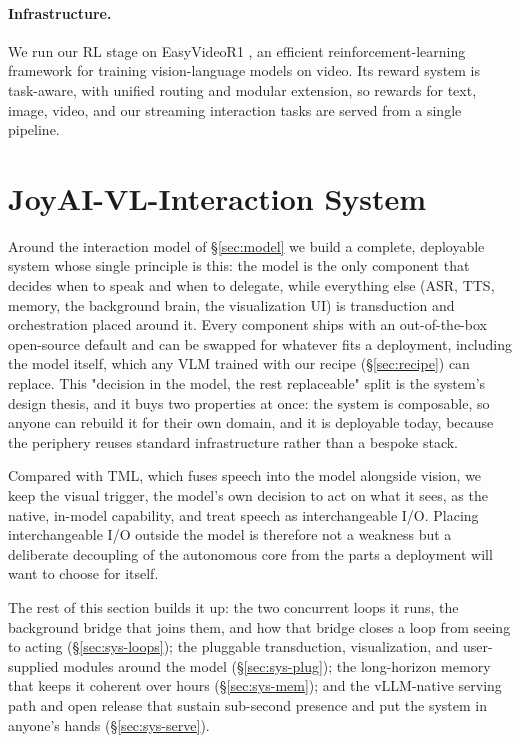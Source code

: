 \paragraph{\textbf{Infrastructure.}}
We run our RL stage on EasyVideoR1 \cite{qin2026easyvideor1easierrlvideo}, an efficient reinforcement-learning framework for training vision-language models on video. Its reward system is task-aware, with unified routing and modular extension, so rewards for text, image, video, and our streaming interaction tasks are served from a single pipeline. 





\section{JoyAI-VL-Interaction System}\label{sec:system}
Around the interaction model of §\ref{sec:model} we build a complete, deployable system whose single principle is this: the model is the only component that decides when to speak and when to delegate, while everything else (ASR, TTS, memory, the background brain, the visualization UI) is transduction and orchestration placed around it. Every component ships with an out-of-the-box open-source default and can be swapped for whatever fits a deployment, including the model itself, which any VLM trained with our recipe (§\ref{sec:recipe}) can replace. This "decision in the model, the rest replaceable" split is the system's design thesis, and it buys two properties at once: the system is composable, so anyone can rebuild it for their own domain, and it is deployable today, because the periphery reuses standard infrastructure rather than a bespoke stack.

Compared with TML, which fuses speech into the model alongside vision, we keep the visual trigger, the model's own decision to act on what it sees, as the native, in-model capability, and treat speech as interchangeable I/O. Placing interchangeable I/O outside the model is therefore not a weakness but a deliberate decoupling of the autonomous core from the parts a deployment will want to choose for itself.


The rest of this section builds it up: the two concurrent loops it runs, the background bridge that joins them, and how that bridge closes a loop from seeing to acting (§\ref{sec:sys-loops}); the pluggable transduction, visualization, and user-supplied modules around the model (§\ref{sec:sys-plug}); the long-horizon memory that keeps it coherent over hours (§\ref{sec:sys-mem}); and the vLLM-native serving path and open release that sustain sub-second presence and put the system in anyone's hands (§\ref{sec:sys-serve}).

